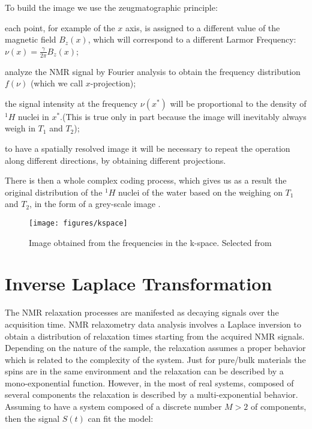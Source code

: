 \documentclass[a4paper,11pt]{report}
\begin{document}
To build the image we use the zeugmatographic principle:
\begin{list}{-}{}
	\item each point, for example of the $x$ axis, is assigned to a different value of the magnetic field $B_z(x)$, which will correspond to a different Larmor Frequency: $\nu(x)= \frac{\gamma}{2 \pi} B_z (x)$;
	\item analyze the NMR signal by Fourier analysis to obtain the frequency distribution $f(\nu)$ (which we call $x$-projection);
	\item the signal intensity at the frequency $\nu(x^*)$ will be proportional to the density of $^1H$ nuclei in $x^*$.(This is true only in part because the image will inevitably always weigh in $T_1$ and $T_2$);
	\item to have a spatially resolved image it will be necessary to repeat the operation along different directions, by obtaining different projections.
\end{list}

There is then a whole complex coding process, which gives us as a result the original distribution of the $^1H$ nuclei of the water based on the weighing on $T_1$ and $T_2$, in the form of a grey-scale image .  

\begin{figure}[h]
	\centering
	\texttt{[image: figures/kspace]}
	\caption{Image obtained from the frequencies in the k-space. Selected from \cite{kspace}}\label{kspace}
\end{figure}



\section{Inverse Laplace Transformation}

The NMR relaxation processes are manifested as decaying signals over the acquisition time. NMR relaxometry data analysis involves a Laplace inversion to obtain a distribution of relaxation times starting from the acquired NMR signals.\\
Depending on the nature of the sample, the relaxation assumes a proper behavior which is related to the complexity of the system. Just for pure/bulk materials the spins are in the same environment and the relaxation can be described by a mono-exponential function. However, in the most of real systems, composed of several components the relaxation is described by a multi-exponential behavior. Assuming to have a system composed of a discrete number $M> 2$ of components, then the signal $S(t)$ can fit the model: 
\end{document}

